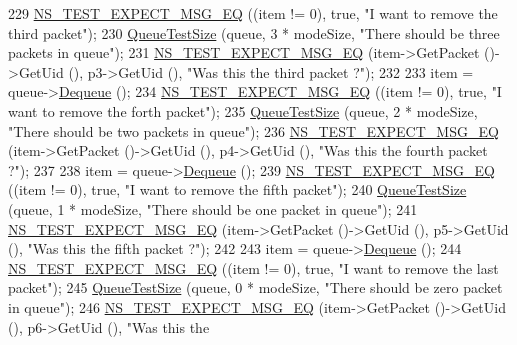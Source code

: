 \begin{DoxyCode}
229   \hyperlink{group__testing_ga7304ba46a28d8cf08dfdfd6499cf7068}{NS\_TEST\_EXPECT\_MSG\_EQ} ((item != 0), \textcolor{keyword}{true}, \textcolor{stringliteral}{"I want to remove the third packet"});
230   \hyperlink{classCoDelQueueDiscBasicEnqueueDequeue_abd4b321f709f67998f635c2f6567b993}{QueueTestSize} (queue, 3 * modeSize, \textcolor{stringliteral}{"There should be three packets in queue"});
231   \hyperlink{group__testing_ga7304ba46a28d8cf08dfdfd6499cf7068}{NS\_TEST\_EXPECT\_MSG\_EQ} (item->GetPacket ()->GetUid (), p3->GetUid (), \textcolor{stringliteral}{"Was this the
       third packet ?"});
232 
233   item = queue->\hyperlink{classns3_1_1QueueDisc_a6c13fc489822c1487f61c2289f2e3629}{Dequeue} ();
234   \hyperlink{group__testing_ga7304ba46a28d8cf08dfdfd6499cf7068}{NS\_TEST\_EXPECT\_MSG\_EQ} ((item != 0), \textcolor{keyword}{true}, \textcolor{stringliteral}{"I want to remove the forth packet"});
235   \hyperlink{classCoDelQueueDiscBasicEnqueueDequeue_abd4b321f709f67998f635c2f6567b993}{QueueTestSize} (queue, 2 * modeSize, \textcolor{stringliteral}{"There should be two packets in queue"});
236   \hyperlink{group__testing_ga7304ba46a28d8cf08dfdfd6499cf7068}{NS\_TEST\_EXPECT\_MSG\_EQ} (item->GetPacket ()->GetUid (), p4->GetUid (), \textcolor{stringliteral}{"Was this the
       fourth packet ?"});
237 
238   item = queue->\hyperlink{classns3_1_1QueueDisc_a6c13fc489822c1487f61c2289f2e3629}{Dequeue} ();
239   \hyperlink{group__testing_ga7304ba46a28d8cf08dfdfd6499cf7068}{NS\_TEST\_EXPECT\_MSG\_EQ} ((item != 0), \textcolor{keyword}{true}, \textcolor{stringliteral}{"I want to remove the fifth packet"});
240   \hyperlink{classCoDelQueueDiscBasicEnqueueDequeue_abd4b321f709f67998f635c2f6567b993}{QueueTestSize} (queue, 1 * modeSize, \textcolor{stringliteral}{"There should be one packet in queue"});
241   \hyperlink{group__testing_ga7304ba46a28d8cf08dfdfd6499cf7068}{NS\_TEST\_EXPECT\_MSG\_EQ} (item->GetPacket ()->GetUid (), p5->GetUid (), \textcolor{stringliteral}{"Was this the
       fifth packet ?"});
242 
243   item = queue->\hyperlink{classns3_1_1QueueDisc_a6c13fc489822c1487f61c2289f2e3629}{Dequeue} ();
244   \hyperlink{group__testing_ga7304ba46a28d8cf08dfdfd6499cf7068}{NS\_TEST\_EXPECT\_MSG\_EQ} ((item != 0), \textcolor{keyword}{true}, \textcolor{stringliteral}{"I want to remove the last packet"});
245   \hyperlink{classCoDelQueueDiscBasicEnqueueDequeue_abd4b321f709f67998f635c2f6567b993}{QueueTestSize} (queue, 0 * modeSize, \textcolor{stringliteral}{"There should be zero packet in queue"});
246   \hyperlink{group__testing_ga7304ba46a28d8cf08dfdfd6499cf7068}{NS\_TEST\_EXPECT\_MSG\_EQ} (item->GetPacket ()->GetUid (), p6->GetUid (), \textcolor{stringliteral}{"Was this the
}
\end{DoxyCode}

